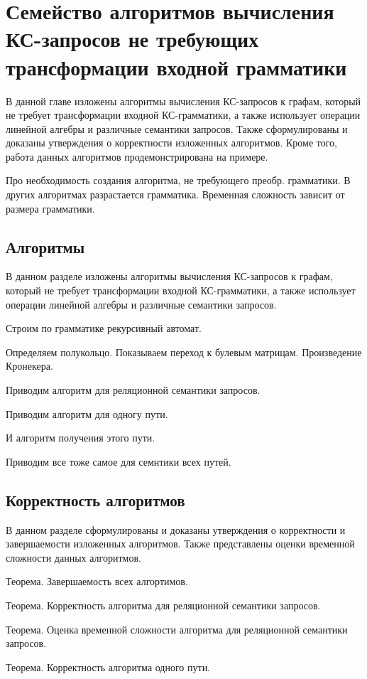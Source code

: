 \chapter{Семейство алгоритмов вычисления КС-запросов не требующих трансформации входной грамматики}\label{ch:ch4}
В данной главе изложены алгоритмы вычисления КС-запросов к графам, который не требует трансформации входной КС-грамматики, а также использует операции линейной алгебры и различные семантики запросов. Также сформулированы и доказаны утверждения о корректности изложенных алгоритмов. Кроме того, работа данных алгоритмов продемонстрирована на примере.

Про необходимость создания алгоритма, не требующего преобр. грамматики. В других алгоритмах разрастается грамматика. Временная сложность зависит от размера грамматики.
\section{Алгоритмы}\label{sec:ch4/sect1}
В данном разделе изложены алгоритмы вычисления КС-запросов к графам, который не требует трансформации входной КС-грамматики, а также использует операции линейной алгебры и различные семантики запросов.

Строим по грамматике рекурсивный автомат.

Определяем полукольцо. Показываем переход к булевым матрицам. Произведение Кронекера.

Приводим алгоритм для реляционной семантики запросов.

Приводим алгоритм для одногу пути.

И алгоритм получения этого пути.

Приводим все тоже самое для семнтики всех путей.

\section{Корректность алгоритмов}\label{sec:ch4/sect2}
В данном разделе сформулированы и доказаны утверждения о корректности и завершаемости изложенных алгоритмов. Также представлены оценки временной сложности данных алгоритмов.

Теорема. Завершаемость всех алгортимов.

Теорема. Корректность алгоритма для реляционной семантики запросов.

Теорема. Оценка временной сложности алгоритма для реляционной семантики запросов.

Теорема. Корректность алгоритма одного пути.

